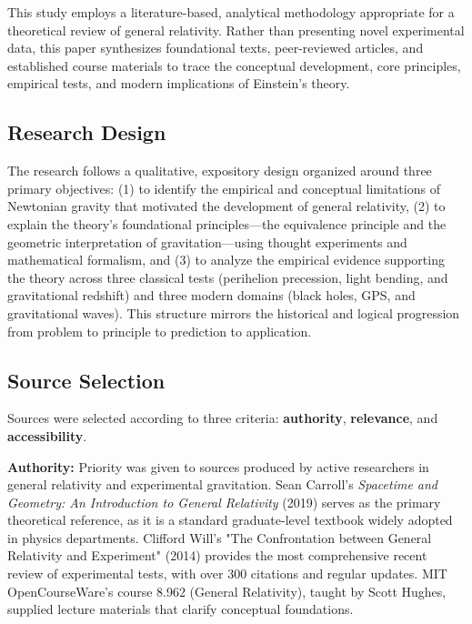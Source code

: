 \documentclass[12pt, a4paper]{article}
\begin{document}
	This study employs a literature-based, analytical methodology appropriate for a theoretical review of general relativity. Rather than presenting novel experimental data, this paper synthesizes foundational texts, peer-reviewed articles, and established course materials to trace the conceptual development, core principles, empirical tests, and modern implications of Einstein's theory.

	\subsection{Research Design}

	The research follows a qualitative, expository design organized around three primary objectives: (1) to identify the empirical and conceptual limitations of Newtonian gravity that motivated the development of general relativity, (2) to explain the theory's foundational principles—the equivalence principle and the geometric interpretation of gravitation—using thought experiments and mathematical formalism, and (3) to analyze the empirical evidence supporting the theory across three classical tests (perihelion precession, light bending, and gravitational redshift) and three modern domains (black holes, GPS, and gravitational waves). This structure mirrors the historical and logical progression from problem to principle to prediction to application.

	\subsection{Source Selection}

	Sources were selected according to three criteria: \textbf{authority}, \textbf{relevance}, and \textbf{accessibility}.

	\textbf{Authority:} Priority was given to sources produced by active researchers in general relativity and experimental gravitation. Sean Carroll's \textit{Spacetime and Geometry: An Introduction to General Relativity} (2019) serves as the primary theoretical reference, as it is a standard graduate-level textbook widely adopted in physics departments. Clifford Will's "The Confrontation between General Relativity and Experiment" (2014) provides the most comprehensive recent review of experimental tests, with over 300 citations and regular updates. MIT OpenCourseWare's course 8.962 (General Relativity), taught by Scott Hughes, supplied lecture materials that clarify conceptual foundations.
\end{document}
